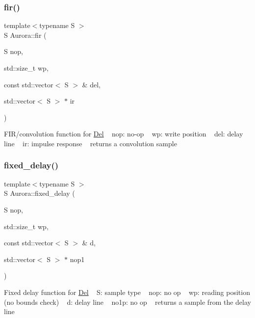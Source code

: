\subsubsection{\texorpdfstring{fir()}{fir()}}
{\footnotesize\ttfamily template$<$typename S $>$ \\
S Aurora\+::fir (\begin{DoxyParamCaption}\item[{S}]{nop,  }\item[{std\+::size\+\_\+t}]{wp,  }\item[{const std\+::vector$<$ S $>$ \&}]{del,  }\item[{std\+::vector$<$ S $>$ $\ast$}]{ir }\end{DoxyParamCaption})\hspace{0.3cm}{\ttfamily [inline]}}

F\+I\+R/convolution function for \hyperlink{class_aurora_1_1_del}{Del} ~\newline
nop\+: no-\/op ~\newline
wp\+: write position ~\newline
del\+: delay line ~\newline
ir\+: impulse response ~\newline
returns a convolution sample \mbox{\label{namespace_aurora_afe9bb9ea0f50912f1fc95a2b15b135dd}} 
\subsubsection{\texorpdfstring{fixed\+\_\+delay()}{fixed\_delay()}}
{\footnotesize\ttfamily template$<$typename S $>$ \\
S Aurora\+::fixed\+\_\+delay (\begin{DoxyParamCaption}\item[{S}]{nop,  }\item[{std\+::size\+\_\+t}]{wp,  }\item[{const std\+::vector$<$ S $>$ \&}]{d,  }\item[{std\+::vector$<$ S $>$ $\ast$}]{nop1 }\end{DoxyParamCaption})\hspace{0.3cm}{\ttfamily [inline]}}

Fixed delay function for \hyperlink{class_aurora_1_1_del}{Del} ~\newline
S\+: sample type ~\newline
nop\+: no op ~\newline
wp\+: reading position (no bounds check) ~\newline
d\+: delay line ~\newline
no1p\+: no op ~\newline
returns a sample from the delay line \mbox{\label{namespace_aurora_aca47d4c2fcfc307c85418fe7a0b1e98e}} 
